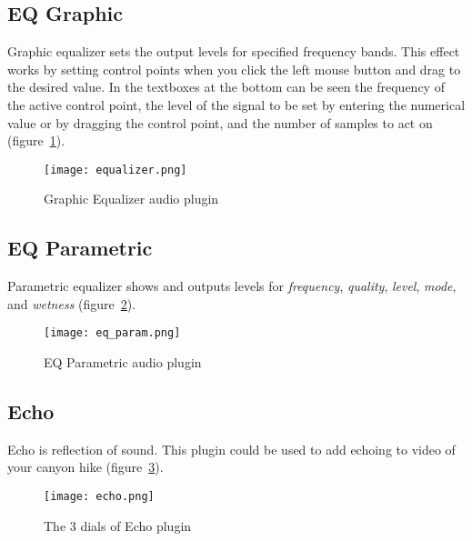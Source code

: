 \subsection{EQ Graphic}%
\label{sub:eq_graphic}

Graphic equalizer sets the output levels for specified frequency bands. This effect works by setting control points when you click the left mouse button and drag to the desired value. In the textboxes at the bottom can be seen the frequency of the active control point, the level of the signal to be set by entering the numerical value or by dragging the control point, and the number of samples to act on (figure~\ref{fig:equalizer}).

\begin{figure}[htpb]
    \centering
    \texttt{[image: equalizer.png]}
    \caption{Graphic Equalizer audio plugin}
    \label{fig:equalizer}
\end{figure}

\subsection{EQ Parametric}%
\label{sub:eq_parametric}

Parametric equalizer shows and outputs levels for \textit{frequency}, \textit{quality}, \textit{level}, \textit{mode}, and \textit{wetness} (figure~\ref{fig:eq_param}).

\begin{figure}[htpb]
	\centering
	\texttt{[image: eq\_param.png]}
	\caption{EQ Parametric audio plugin}
	\label{fig:eq_param}
\end{figure}

\subsection{Echo}%
\label{sub:echo}

Echo is reflection of sound. This plugin could be used to add echoing to video of your canyon hike (figure~\ref{fig:echo}).

\begin{figure}[htpb]
    \centering
    \texttt{[image: echo.png]}
    \caption{The 3 dials of Echo plugin}
    \label{fig:echo}
\end{figure}

